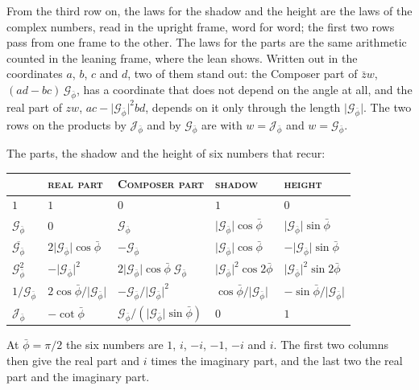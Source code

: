 \documentclass[11pt,a4paper]{amsart}
\theoremstyle{plain}
\theoremstyle{definition}
\theoremstyle{remark}
\newcommand{\pb}{\bar{\phi}}                     %
\newcommand{\Gp}{\mathcal{G}_{\bar{\phi}}}       %
\newcommand{\Jp}{\mathcal{J}_{\bar{\phi}}}       %
\begin{document}
From the third row on, the laws for the shadow and the height are the laws of the complex numbers, read in the upright frame, word for word; the first two rows pass from one frame to the other. The laws for the parts are the same arithmetic counted in the leaning frame, where the lean shows. Written out in the coordinates $a$, $b$, $c$ and $d$, two of them stand out: the Composer part of $\bar{z}w$, $(ad - bc)\,\Gp$, has a coordinate that does not depend on the angle at all, and the real part of $zw$, $ac - \lvert\Gp\rvert^2bd$, depends on it only through the length $\lvert\Gp\rvert$. The two rows on the products by $\Jp$ and by $\Gp$ are  with $w = \Jp$ and $w = \Gp$.

\medskip
\noindent\begin{minipage}{\textwidth}
\setlength{\parindent}{0pt}
The parts, the shadow and the height of six numbers that recur:
\begin{center}
\small
\renewcommand{\arraystretch}{1.2}
\begin{tabular}{@{}lllll@{}}
\toprule
 & \textsc{real part} & \textsc{Composer part} & \textsc{shadow} & \textsc{height} \\
\midrule
$1$ & $1$ & $0$ & $1$ & $0$ \\
$\Gp$ & $0$ & $\Gp$ & $\lvert\Gp\rvert\cos\pb$ & $\lvert\Gp\rvert\sin\pb$ \\
$\overline{\Gp}$ & $2\lvert\Gp\rvert\cos\pb$ & $-\Gp$ & $\lvert\Gp\rvert\cos\pb$ & $-\lvert\Gp\rvert\sin\pb$ \\
$\Gp^2$ & $-\lvert\Gp\rvert^2$ & $2\lvert\Gp\rvert\cos\pb\;\Gp$ & $\lvert\Gp\rvert^2\cos 2\pb$ & $\lvert\Gp\rvert^2\sin 2\pb$ \\
$1/\Gp$ & $2\cos\pb/\lvert\Gp\rvert$ & $-\Gp/\lvert\Gp\rvert^2$ & $\cos\pb/\lvert\Gp\rvert$ & $-\sin\pb/\lvert\Gp\rvert$ \\
$\Jp$ & $-\cot\pb$ & $\Gp/(\lvert\Gp\rvert\sin\pb)$ & $0$ & $1$ \\
\bottomrule
\end{tabular}
\end{center}
At $\pb = \pi/2$ the six numbers are $1$, $i$, $-i$, $-1$, $-i$ and $i$. The first two columns then give the real part and $i$ times the imaginary part, and the last two the real part and the imaginary part.
\end{minipage}
\end{document}
